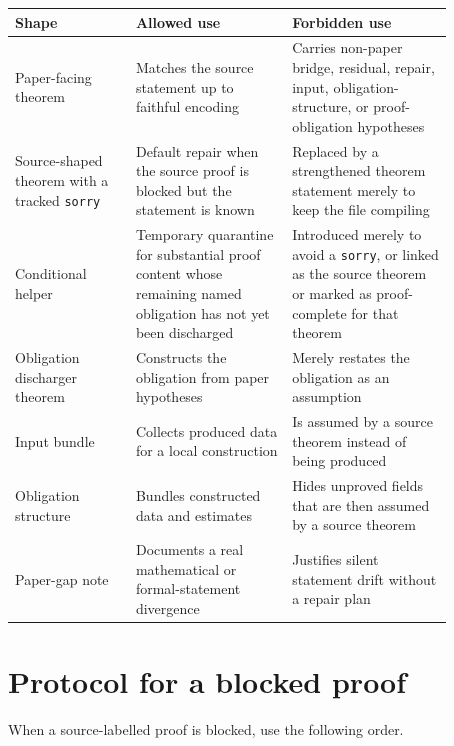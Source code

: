 \documentclass[11pt]{article}
\begin{document}
\begin{center}
\begin{tabular}{p{0.24\linewidth}p{0.31\linewidth}p{0.32\linewidth}}
\textbf{Shape} & \textbf{Allowed use} & \textbf{Forbidden use} \\
\hline
Paper-facing theorem & Matches the source statement up to faithful encoding &
Carries non-paper bridge, residual, repair, input, obligation-structure, or
proof-obligation hypotheses \\
Source-shaped theorem with a tracked \verb|sorry| & Default repair when the
source proof is blocked but the statement is known & Replaced by a strengthened
theorem statement merely to keep the file compiling \\
Conditional helper & Temporary quarantine for substantial proof content whose
remaining named obligation has not yet been discharged & Introduced merely to
avoid a \verb|sorry|, or linked as the source theorem or marked as
proof-complete for that theorem \\
Obligation discharger theorem & Constructs the obligation from paper hypotheses &
Merely restates the obligation as an assumption \\
Input bundle & Collects produced data for a local construction & Is assumed by a
source theorem instead of being produced \\
Obligation structure & Bundles constructed data and estimates & Hides unproved
fields that are then assumed by a source theorem \\
Paper-gap note & Documents a real mathematical or formal-statement divergence &
Justifies silent statement drift without a repair plan
\end{tabular}
\end{center}

\section{Protocol for a blocked proof}

When a source-labelled proof is blocked, use the following order.
\end{document}
